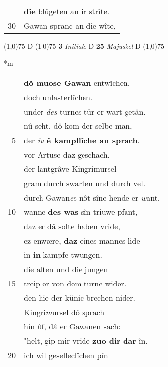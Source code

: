 \documentclass[8pt,a4paper,notitlepage]{article}
\begin{document}
\begin{table}[ht]
\begin{minipage}[t]{0.5\linewidth}
\begin{tabular}{rl}
 & \textbf{die} blûgeten an ir strîte.\\ 
30 & Gawan spranc an die wîte,\\ 
\end{tabular}
\scriptsize
\line(1,0){75} \newline
D \newline
\line(1,0){75} \newline
\textbf{3} \textit{Initiale} D  \textbf{25} \textit{Majuskel} D  \newline
\line(1,0){75} \newline
\newline
\end{minipage}
\hspace{0.5cm}
\begin{minipage}[t]{0.5\linewidth}
\small
\begin{center}*m
\end{center}
\begin{tabular}{rl}
 & \textbf{dô muose Gawan} entwîchen,\\ 
 & doch unlasterlîchen.\\ 
 & under \textit{des} turnes tür er wart getân.\\ 
 & nû seht, dô kom der selbe man,\\ 
5 & der \textit{in} \textbf{ê kampflîche an sprach}.\\ 
 & vor Artuse daz geschach.\\ 
 & der lantgrâve Kingrimursel\\ 
 & gram durch swarten und durch vel.\\ 
 & durch Gawan\textit{e}s nôt sîne hende er \textit{w}ant.\\ 
10 & wanne \textbf{des was} sîn triuwe pfant,\\ 
 & daz er dâ solte haben vride,\\ 
 & ez enwære, \textbf{daz} eines mannes lide\\ 
 & in \textbf{in} kampfe twungen.\\ 
 & die alten und die jungen\\ 
15 & treip er von dem turne wider.\\ 
 & den hie der künic brechen nider.\\ 
 & Kingri\textit{m}ursel dô sprach\\ 
 & hin ûf, dâ er Gawanen sach:\\ 
 & "helt, gip mir vride \textbf{zuo dir} \textbf{dar} în.\\ 
20 & ich wil geselleclîchen pîn\\ 

\end{tabular}
\end{minipage}
\end{table}
\end{document}
